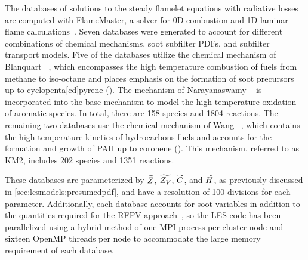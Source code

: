 The databases of solutions to the steady flamelet equations with radiative losses are computed with FlameMaster, a solver for 0D combustion and 1D laminar flame calculations~\cite{flamemaster}. Seven databases were generated to account for different combinations of chemical mechanisms, soot subfilter PDFs, and subfilter transport models. Five of the databases utilize the chemical mechanism of Blanquart \etal~\cite{blanquart2009588}, which encompasses the high temperature combustion of fuels from methane to iso-octane and places emphasis on the formation of soot precursors up to cyclopenta[cd]pyrene (). The mechanism of Narayanaswamy \etal~\cite{narayanaswamy2010} is incorporated into the base mechanism to model the high-temperature oxidation of aromatic species. In total, there are 158 species and 1804 reactions. The remaining two databases use the chemical mechanism of Wang \etal~\cite{wang2013}, which contains the high temperature kinetics of  hydrocarbons fuels and accounts for the formation and growth of PAH up to coronene (). This mechanism, referred to as KM2, includes 202 species and 1351 reactions.

These databases are parameterized by $\widetilde{Z}$, $\widetilde{Z_V}$, $\widetilde{C}$, and $\widetilde{H}$, as previously discussed in \cref{sec:lesmodels:presumedpdf}, and have a resolution of 100 divisions for each parameter. Additionally, each database accounts for soot variables in addition to the quantities required for the RFPV approach~\cite{ihme2008}, so the LES code has been parallelized using a hybrid method of one MPI process per cluster node and sixteen OpenMP threads per node to accommodate the large memory requirement of each database.
